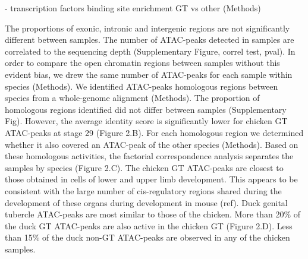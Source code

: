 - transcription factors binding site enrichment GT vs other (Methods)

The proportions of exonic, intronic and intergenic regions are not significantly different between samples. The number of ATAC-peaks detected in samples are correlated to the sequencing depth (Supplementary Figure, correl test, pval). In order to compare the open chromatin regions between samples without this evident bias, we drew the same number of ATAC-peaks for each sample within species (Methods). We identified ATAC-peaks homologous regions between species from a whole-genome alignment (Methods). The proportion of homologous regions identified did not differ between samples (Supplementary Fig). However, the average identity score is significantly lower for chicken GT ATAC-peaks at stage 29 (Figure 2.B). For each homologous region we determined whether it also covered an ATAC-peak of the other species (Methods). Based on these homologous activities, the factorial correspondence analysis separates the samples by species (Figure 2.C). The chicken GT ATAC-peaks are closest to those obtained in cells of lower and upper limb development. This appears to be consistent with the large number of cis-regulatory regions shared during the development of these organs during development in mouse (ref). Duck genital tubercle ATAC-peaks are most similar to those of the chicken. More than 20\% of the duck GT ATAC-peaks are also active in the chicken GT (Figure 2.D). Less than 15\% of the duck non-GT ATAC-peaks are observed in any of the chicken samples.

